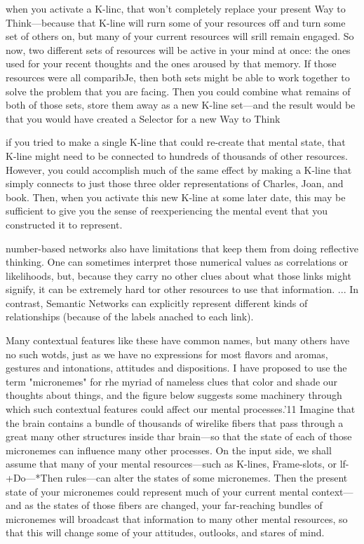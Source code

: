 \documentclass[10pt,a4paper]{article}
\begin{document}
when you activate a K-linc, that won't completely replace your present Way to Think—because that K-line will rurn some of your resources off and turn some set of others on, but many of your current resources will srill remain engaged. So now, two different sets of resources will be active in your mind at once: the ones used for your recent thoughts and the ones aroused by that memory. If those resources were all comparibJe, then both sets might be able to work together to solve the problem that you are facing. Then you could combine what remains of both of those sets, store them away as a new K-line set—and the result would be that you would have created a Selector for a new Way to Think \cite[p.~288]{minsky}

if you tried to make a single K-line that could re-create that mental state, that K-line might need to be connected to hundreds of thousands of other resources. However, you could accomplish much of the same effect by making a K-line that simply connects to just those three older representations of Charles, Joan, and book. Then, when you activate this new K-line at some later date, this may be sufficient to give you the sense of reexperiencing the mental event that you constructed it to represent. \cite[p.~289]{minsky}

number-based networks also have limitations that keep them from doing reflective thinking. One can sometimes interpret those numerical values as correlations or likelihoods, but, because they carry no other clues about what those links might signify, it can be extremely hard tor other resources to use that information.
...
In contrast, Semantic Networks can explicitly represent different kinds of relationships (because of the labels anached to each link). \cite[p.~290]{minsky}

Many contextual features like these have common names, but many others have no such wotds, just as we have no expressions for most flavors and aromas, gestures and intonations, attitudes and dispositions. I have proposed to use the term "micronemes" for rhe myriad of nameless clues that color and shade our thoughts about things, and the figure below suggests some machinery through which such contextual features could affect our mental processes.'11 Imagine that the brain contains a bundle of thousands of wirelike fibers that pass through a great many other structures inside thar brain—so that the state of each of those micronemes can influence many other processes.
On the input side, we shall assume that many of your mental resources—such as K-lines, Frame-slots, or lf-+Do—*Then rules—can alter the states of some micronemes. Then the present state of your micronemes could represent much of your current mental context—and as the states of those fibers are changed, your far-reaching bundles of micronemes will broadcast that information to many other mental resources, so that this will change some of your attitudes, outlooks, and stares of mind. \cite[p.~291-292]{minsky}
\end{document}
